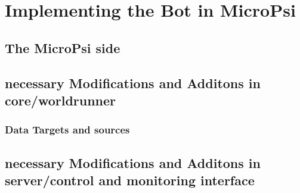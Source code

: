 \chapter{Implementing the Bot in MicroPsi}

\section{The MicroPsi side}

\section{necessary Modifications and Additons in core/worldrunner}

\subsection{Data Targets and sources}

\section{necessary Modifications and Additons in server/control and monitoring interface}